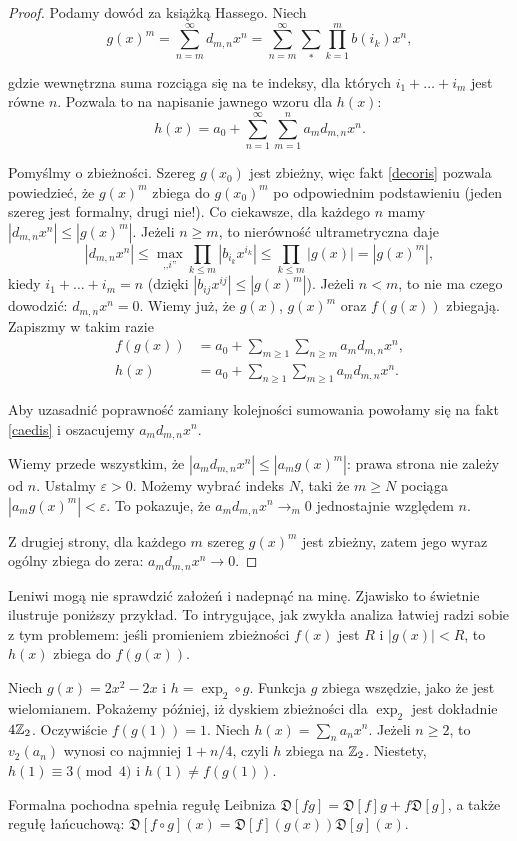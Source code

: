\begin{proof}
	Podamy dowód za książką Hassego.
	Niech
	\[
		g(x)^m = \sum_{n=m}^\infty d_{m, n} x^n = \sum_{n=m}^\infty \sum_{*} \prod_{k=1}^m b(i_k) x^n,
	\]

	gdzie wewnętrzna suma rozciąga się na te indeksy, dla których $i_1 + \ldots + i_m$ jest równe $n$.
	Pozwala to na napisanie jawnego wzoru dla $h(x)$:
	\[
		h(x) = a_0 + \sum_{n = 1}^\infty \sum_{m = 1}^n a_m d_{m, n} x^n.
	\]

	Pomyślmy o zbieżności.
	Szereg $g(x_0)$ jest zbieżny, więc fakt \ref{decoris} pozwala powiedzieć, że $g(x)^m$ zbiega do $g(x_0)^m$ po odpowiednim podstawieniu (jeden szereg jest formalny, drugi nie!).
	Co ciekawsze, dla każdego $n$ mamy $|d_{m,n}x^n| \le |g(x)^m|$.
	Jeżeli $n \ge m$, to nierówność ultrametryczna daje
	\[
		|d_{m,n}x^n| \le \max_{\mbox{,,}i\mbox{''}} \prod_{k \le m} |b_{i_k} x^{i_k}| \le \prod_{k \le m} |g(x)| = |g(x)^m|,
	\]
	kiedy $i_1 + \ldots + i_m = n$ (dzięki $|b_{ij} x^{ij}| \le |g(x)^m|$).
	Jeżeli $n < m$, to nie ma czego dowodzić: $d_{m,n}x^n = 0$.
	Wiemy już, że $g(x)$, $g(x)^m$ oraz $f(g(x))$ zbiegają.
	Zapiszmy w takim razie
	\begin{align*}
	 	f(g(x))	& = a_0 + \sum_{m \ge 1} \sum_{n \ge m} a_m d_{m,n}x^n,\\
		h(x) & = a_0 + \sum_{n \ge 1} \sum_{m \ge 1} a_md_{m,n} x^n.
	\end{align*}

	Aby uzasadnić poprawność zamiany kolejności sumowania powołamy się na fakt \ref{caedis} i oszacujemy $a_md_{m,n}x^n$.

	Wiemy przede wszystkim, że $|a_md_{m,n}x^n| \le |a_mg(x)^m|$: prawa strona nie zależy od $n$.
	Ustalmy $\varepsilon > 0$.
	Możemy wybrać indeks $N$, taki że $m \ge N$ pociąga $|a_mg(x)^m| < \varepsilon$.
	To pokazuje, że $a_md_{m,n}x^n \to_m 0$ jednostajnie względem $n$.

	Z drugiej strony, dla każdego $m$ szereg $g(x)^m$ jest zbieżny, zatem jego wyraz ogólny zbiega do zera: $a_m d_{m,n}x^n \to 0$.
\end{proof}

Leniwi mogą nie sprawdzić założeń i nadepnąć na minę.
Zjawisko to świetnie ilustruje poniższy przykład.
To intrygujące, jak zwykła analiza łatwiej radzi sobie z tym problemem: jeśli promieniem zbieżności $f(x)$ jest $R $ i $|g(x)| < R $, to $h(x)$ zbiega do $f(g(x))$.

\begin{przyklad}\label{leniwy}
	Niech $g(x) = 2x^2 - 2x$ i $h = \exp_2 \circ g$.
	Funkcja $g$ zbiega wszędzie, jako że jest wielomianem.
	Pokażemy później, iż dyskiem zbieżności dla $\exp_2$ jest dokładnie $4\mathbb Z_2$.
	Oczywiście $f(g(1)) = 1$.
	Niech $h(x) = \sum_n a_n x^n$.
	Jeżeli $n \ge 2$, to $v_2(a_n)$ wynosi co najmniej $1 + n / 4$, czyli $h$ zbiega na $\mathbb Z_2$.
	Niestety, $h(1) \equiv 3 \pmod {4}$ i $h(1) \neq f(g(1))$.
\end{przyklad}

\begin{fakt}
	Formalna pochodna spełnia regułę Leibniza $\mathfrak D[fg] = \mathfrak D[f]g + f \mathfrak D[g]$, a także regułę łańcuchową: $\mathfrak D[f \circ g](x) = \mathfrak D [f](g(x)) \mathfrak D [g](x)$.
\end{fakt}